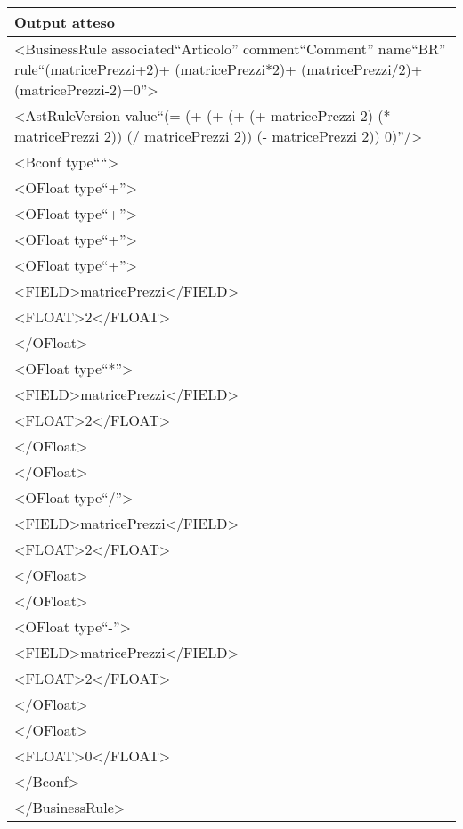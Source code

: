 \begin{center}
\begin{tabular}{|p{11cm}|} \hline
\textbf{Output atteso}\\ \hline
\textless BusinessRule associated``Articolo'' comment``Comment'' name``BR'' rule``(matricePrezzi+2)+ (matricePrezzi*2)+ (matricePrezzi/2)+ (matricePrezzi-2)=0''\textgreater\\
\textless AstRuleVersion value``(= (+ (+ (+ (+ matricePrezzi 2) (* matricePrezzi 2)) (/ matricePrezzi 2)) (- matricePrezzi 2)) 0)''/\textgreater\\
\textless Bconf type````\textgreater\\
\textless OFloat type``+''\textgreater\\
\textless OFloat type``+''\textgreater\\
\textless OFloat type``+''\textgreater\\
\textless OFloat type``+''\textgreater\\
\textless FIELD\textgreater matricePrezzi\textless /FIELD\textgreater\\
\textless FLOAT\textgreater 2\textless /FLOAT\textgreater\\
\textless /OFloat\textgreater\\
\textless OFloat type``*''\textgreater\\
\textless FIELD\textgreater matricePrezzi\textless /FIELD\textgreater\\
\textless FLOAT\textgreater 2\textless /FLOAT\textgreater\\
\textless /OFloat\textgreater\\
\textless /OFloat\textgreater\\
\textless OFloat type``/''\textgreater\\
\textless FIELD\textgreater matricePrezzi\textless /FIELD\textgreater\\
\textless FLOAT\textgreater 2\textless /FLOAT\textgreater\\
\textless /OFloat\textgreater\\
\textless /OFloat\textgreater\\
\textless OFloat type``-''\textgreater\\
\textless FIELD\textgreater matricePrezzi\textless /FIELD\textgreater\\
\textless FLOAT\textgreater 2\textless /FLOAT\textgreater\\
\textless /OFloat\textgreater\\
\textless /OFloat\textgreater\\
\textless FLOAT\textgreater0\textless /FLOAT\textgreater\\
\textless /Bconf\textgreater\\
\textless /BusinessRule\textgreater\\
 \hline
\end{tabular} \\
\end{center}

